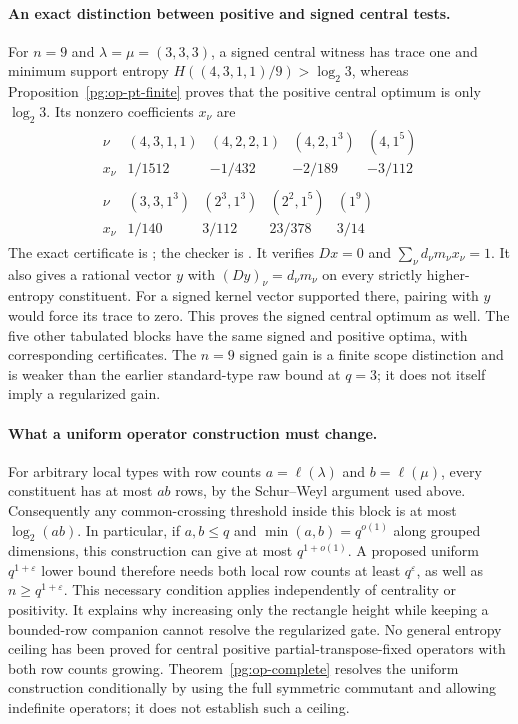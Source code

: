 \paragraph{An exact distinction between positive and signed central tests.}
For $n=9$ and $\lambda=\mu=(3,3,3)$, a signed central witness has trace
one and minimum support entropy $H((4,3,1,1)/9)>\log_2 3$, whereas
Proposition~\ref{pg:op-pt-finite} proves that the positive central optimum
is only $\log_2 3$. Its nonzero coefficients $x_\nu$ are
\[
\begin{gathered}
\begin{array}{c|rrrr}
\nu&(4,3,1,1)&(4,2,2,1)&(4,2,1^3)&(4,1^5)\\ \hline
x_\nu&1/1512&-1/432&-2/189&-3/112
\end{array}\\[5pt]
\begin{array}{c|rrrr}
\nu&(3,3,1^3)&(2^3,1^3)&(2^2,1^5)&(1^9)\\ \hline
x_\nu&1/140&3/112&23/378&3/14
\end{array}
\end{gathered}
\]
The exact certificate is
; the checker
is . It verifies $Dx=0$ and
$\sum_\nu d_\nu m_\nu x_\nu=1$. It also gives a rational vector $y$
with $(Dy)_\nu=d_\nu m_\nu$ on every strictly higher-entropy constituent.
For a signed kernel vector supported there, pairing with $y$ would force
its trace to zero. This proves the signed central optimum as well.
The five other tabulated blocks have the same signed and positive
optima, with corresponding certificates. The $n=9$ signed gain is a
finite scope distinction and is weaker than the earlier standard-type
raw bound at $q=3$; it does not itself imply a regularized gain.

\paragraph{What a uniform operator construction must change.}
For arbitrary local types with row counts $a=\ell(\lambda)$ and
$b=\ell(\mu)$, every constituent has at most $ab$ rows, by the
Schur--Weyl argument used above. Consequently any common-crossing
threshold inside this block is at most $\log_2(ab)$. In particular,
if $a,b\leq q$ and $\min(a,b)=q^{o(1)}$ along grouped dimensions, this
construction can give at most $q^{1+o(1)}$. A proposed uniform
$q^{1+\varepsilon}$ lower bound therefore needs both local row counts
at least $q^\varepsilon$, as well as $n\geq q^{1+\varepsilon}$.
This necessary condition applies independently of centrality or
positivity. It explains why increasing only the rectangle height while
keeping a bounded-row companion cannot resolve the regularized gate.
No general entropy ceiling has been proved for central positive
partial-transpose-fixed operators with both row counts growing.
Theorem~\ref{pg:op-complete} resolves the uniform construction
conditionally by using the full symmetric commutant and allowing
indefinite operators; it does not establish such a ceiling.


